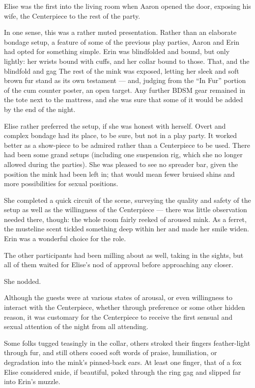 Elise was the first into the living room when Aaron opened the door,
exposing his wife, the Centerpiece to the rest of the party.

In one sense, this was a rather muted presentation. Rather than an
elaborate bondage setup, a feature of some of the previous play parties,
Aaron and Erin had opted for something simple. Erin was blindfolded and
bound, but only lightly: her wrists bound with cuffs, and her collar
bound to those. That, and the blindfold and gag The rest of the mink was
exposed, letting her sleek and soft brown fur stand as its own testament
--- and, judging from the ``In Fur'' portion of the cum counter poster,
an open target. Any further BDSM gear remained in the tote next to the
mattress, and she was sure that some of it would be added by the end of
the night.

Elise rather preferred the setup, if she was honest with herself. Overt
and complex bondage had its place, to be sure, but not in a play party.
It worked better as a show-piece to be admired rather than a Centerpiece
to be used. There had been some grand setups (including one suspension
rig, which she no longer allowed during the parties). She was pleased to
see no spreader bar, given the position the mink had been left in; that
would mean fewer bruised shins and more possibilities for sexual
positions.

She completed a quick circuit of the scene, surveying the quality and
safety of the setup as well as the willingness of the Centerpiece ---
there was little observation needed there, though: the whole room fairly
reeked of aroused mink. As a ferret, the musteline scent tickled
something deep within her and made her smile widen. Erin was a wonderful
choice for the role.

The other participants had been milling about as well, taking in the
sights, but all of them waited for Elise's nod of approval before
approaching any closer.

She nodded.

Although the guests were at various states of arousal, or even
willingness to interact with the Centerpiece, whether through preference
or some other hidden reason, it was customary for the Centerpiece to
receive the first sensual and sexual attention of the night from all
attending.

Some folks tugged teasingly in the collar, others stroked their fingers
feather-light through fur, and still others cooed soft words of praise,
humiliation, or degradation into the mink's pinned-back ears. At least
one finger, that of a fox Elise considered snide, if beautiful, poked
through the ring gag and slipped far into Erin's muzzle.

